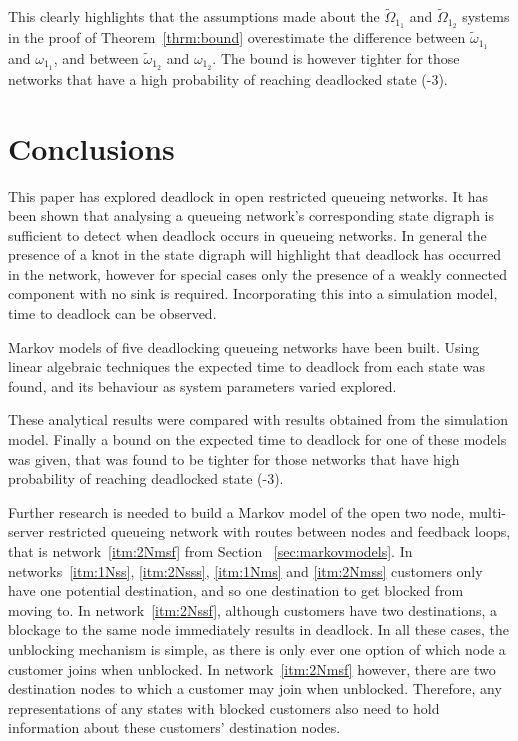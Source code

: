 \documentclass{article}
\numberwithin{equation}{section}
\begin{document}
This clearly highlights that the assumptions made about the $\widetilde{\Omega}_{1_1}$ and $\widetilde{\Omega}_{1_2}$ systems in the proof of Theorem~\ref{thrm:bound} overestimate the difference between $\widetilde{\omega}_{1_1}$ and $\omega_{1_1}$, and between $\widetilde{\omega}_{1_2}$ and $\omega_{1_2}$.
The bound is however tighter for those networks that have a high probability of reaching deadlocked state (-3).


\section{Conclusions}\label{sec:conclusions}

This paper has explored deadlock in open restricted queueing networks.
It has been shown that analysing a queueing network's corresponding state digraph is sufficient to detect when deadlock occurs in queueing networks.
In general the presence of a knot in the state digraph will highlight that deadlock has occurred in the network, however for special cases only the presence of a weakly connected component with no sink is required.
Incorporating this into a simulation model, time to deadlock can be observed.

Markov models of five deadlocking queueing networks have been built.
Using linear algebraic techniques the expected time to deadlock from each state was found, and its behaviour as system parameters varied explored.

These analytical results were compared with results obtained from the simulation model.
Finally a bound on the expected time to deadlock for one of these models was given, that was found to be tighter for those networks that have high probability of reaching deadlocked state (-3).

Further research is needed to build a Markov model of the open two node, multi-server restricted queueing network with routes between nodes and feedback loops, that is network~\ref{itm:2Nmsf} from Section ~\ref{sec:markovmodels}.
In networks~\ref{itm:1Nss}, \ref{itm:2Nsss}, \ref{itm:1Nms} and \ref{itm:2Nmss} customers only have one potential destination, and so one destination to get blocked from moving to. In network~\ref{itm:2Nssf}, although customers have two destinations, a blockage to the same node immediately results in deadlock. In all these cases, the unblocking mechanism is simple, as there is only ever one option of which node a customer joins when unblocked. In network~\ref{itm:2Nmsf} however, there are two destination nodes to which a customer may join when unblocked. Therefore, any representations of any states with blocked customers also need to hold information about these customers' destination nodes.
\end{document}
